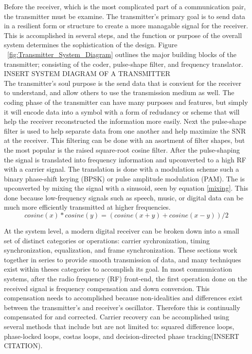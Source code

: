 Before the receiver, which is the most complicated part of a communication pair, the transmitter must be examine.  The transmitter's primary goal is to send data in a resilient form or structure to create a more managable signal for the receiver.  This is accomplished in several steps, and the function or purpose of the overall system determines the sophistication of the design.  Figure ~\ref{fig:Transmitter_System_Diagram} outlines the major building blocks of the transmitter; consisting of the coder, pulse-shape filter, and frequency translator.\\

INSERT SYSTEM DIAGRAM OF A TRANSMITTER\\

The transmitter's soul purpose is the send data that is convient for the receiver to understand, and allow others to use the transmission medium as well.  The coding phase of the transmitter can have many purposes and features, but simply it will encode data into a symbol with a form of redudancy or scheme that will help the receiver reconstructed the information more easily.  Next the pulse-shape filter is used to help separate data from one another and help maximize the SNR at the receiver.  This filtering can be done with an asortment of filter shapes, but the most popular is the raised square-root cosine filter.  After the pulse-shaping the signal is translated into frequency information and upconverted to a high RF with a carrier signal.  The translation is done with a modulation scheme such a binary phase-shift keying (BPSK) or pulse amplitude modulation (PAM).  The is upconverted by mixing the signal with a sinusoid, seen by equation \eqref{mixing}.  This done because low-frequency signals such as speech, music, or digital data can be much more efficiently transmitted at higher frequencies\cite{9}.  \\

\begin{equation}\label{mixing}

cosine(x)*cosine(y)=(cosine(x+y)+cosine(x-y))/2

\end{equation}


At the system level, a modern digital receiver can be broken down into a small set of distinct categories or operations: carrier sychronization, timing synchronization, equalization, and frame synchronization.  These sections work together in series to provide smooth transmission of data, and many techniques exist within theses categories to accomplish its goal.  In most communication systems, after the radio frequency (RF) front-end, the first operation done on the received signal is frequency compensation and down conversion.  This compensation needs to accomplished because non-idealities and differences exist between the transmitter's and receiver's oscillator.  Therefore this is continually compensated for and corrected.  Carrier recovery can be accomplished using several methods that include but are not limited to: squared difference loops, phase-locked loops, costas loops, and decision-directed phase tracking(INSERT CITATION).\\

